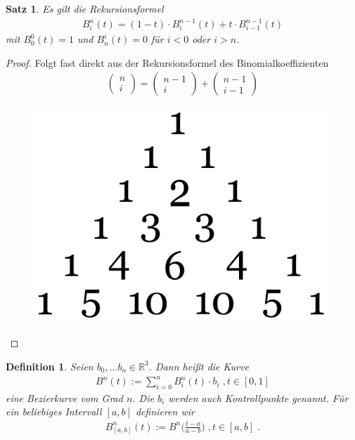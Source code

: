 \documentclass[]{article}
\newtheorem{Definition}{Definition}
\newtheorem{Satz}{Satz}
\begin{document}
\begin{Satz}
Es gilt die Rekursionsformel
\begin{align*}
B_i^n(t) = (1-t) \cdot B^{n-1}_{i}(t) + t \cdot B^{n-1}_{i-1}(t)
\end{align*}
mit $B^0_0(t) = 1$ und $B^i_n(t) = 0$ für $i<0$ oder $i>n$.
\end{Satz}
\begin{proof}
Folgt fast direkt aus der Rekursionsformel des Binomialkoeffizienten
\begin{align*}
\begin{pmatrix} n \\ i \end{pmatrix} = \begin{pmatrix} n-1 \\ i \end{pmatrix} + \begin{pmatrix} n-1 \\ i-1 \end{pmatrix} 
\end{align*}
 \begin{figure}[H]
\centering
\includegraphics[scale=0.2]{pascal.png}
\end{figure}
\end{proof}


\begin{Definition}
Seien $b_0, \hdots b_n \in \mathbb{R}^3$. Dann heißt die Kurve
\begin{align*}
B^n(t) := \sum_{i = 0}^{n} B_i^n(t) \cdot  b_i \; , t \in [0,1] 
\end{align*} 
eine Bezierkurve vom Grad $n$. Die $b_i$ werden auch Kontrollpunkte genannt.
Für ein beliebiges Intervall $[a,b]$ definieren wir
\begin{align*}
B^n_{[a,b]} (t):=  B^n\biggl( \frac{t-a }{a-b} \biggr) \; , t \in [a,b] \; .
\end{align*} 
\end{Definition}
\end{document}
